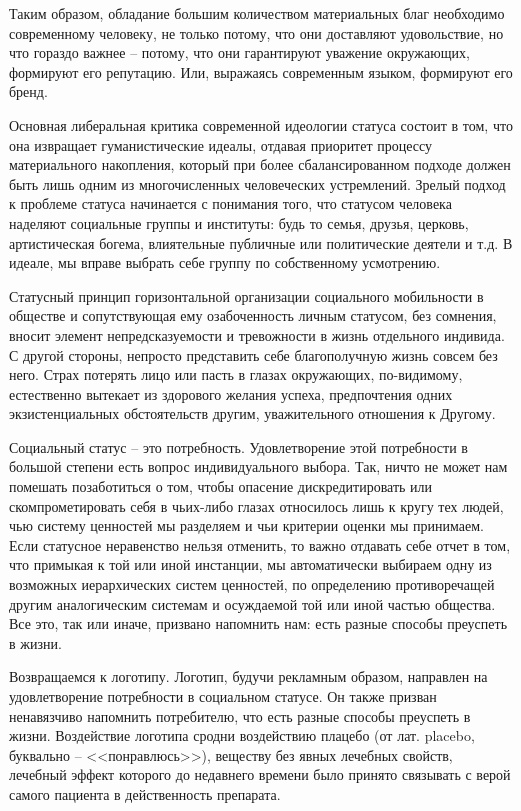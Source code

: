 Таким образом, обладание большим количеством материальных благ необходимо
современному человеку, не только потому, что они доставляют удовольствие, но что
гораздо важнее -- потому, что они гарантируют уважение окружающих, формируют его
репутацию. Или, выражаясь современным языком, формируют его бренд.

Основная либеральная критика современной идеологии  статуса состоит в том, что
она извращает гуманистические идеалы, отдавая приоритет процессу материального
накопления, который при более сбалансированном подходе должен быть лишь одним
из многочисленных человеческих устремлений. Зрелый подход к проблеме статуса
начинается с понимания того, что статусом человека наделяют социальные группы и
институты: будь то семья, друзья, церковь, артистическая богема, влиятельные
публичные или политические деятели и т.д. В идеале, мы вправе выбрать себе
группу по собственному усмотрению.

Статусный принцип горизонтальной организации социального мобильности в обществе
и сопутствующая ему озабоченность личным статусом, без сомнения, вносит элемент
непредсказуемости и тревожности в жизнь отдельного индивида. С другой стороны,
непросто представить себе благополучную жизнь совсем без него. Страх потерять
лицо или пасть в глазах окружающих, по-видимому, естественно вытекает из здорового
желания успеха, предпочтения одних экзистенциальных обстоятельств другим,
уважительного отношения к Другому.

Социальный статус -- это потребность. Удовлетворение этой потребности в большой
степени есть вопрос индивидуального выбора. Так, ничто не может нам помешать
позаботиться о том, чтобы опасение дискредитировать или скомпрометировать себя в
чьих-либо глазах относилось лишь к кругу тех людей, чью систему ценностей мы
разделяем и чьи критерии оценки мы принимаем. Если статусное неравенство нельзя
отменить, то важно отдавать себе отчет в том, что примыкая к той или иной
инстанции, мы автоматически выбираем одну из возможных иерархических систем
ценностей, по определению противоречащей другим аналогическим системам и
осуждаемой той или иной частью общества. Все это, так или иначе, призвано
напомнить нам: есть разные способы преуспеть в жизни.

Возвращаемся к логотипу. Логотип, будучи рекламным образом, направлен на
удовлетворение потребности в социальном статусе. Он также призван ненавязчиво
напомнить потребителю, что есть разные способы преуспеть в жизни. Воздействие
логотипа сродни воздействию плацебо (от лат. placebo, буквально -- <<понравлюсь>>),
веществу без явных лечебных свойств, лечебный эффект которого до недавнего
времени было принято связывать с верой самого пациента в действенность
препарата.

